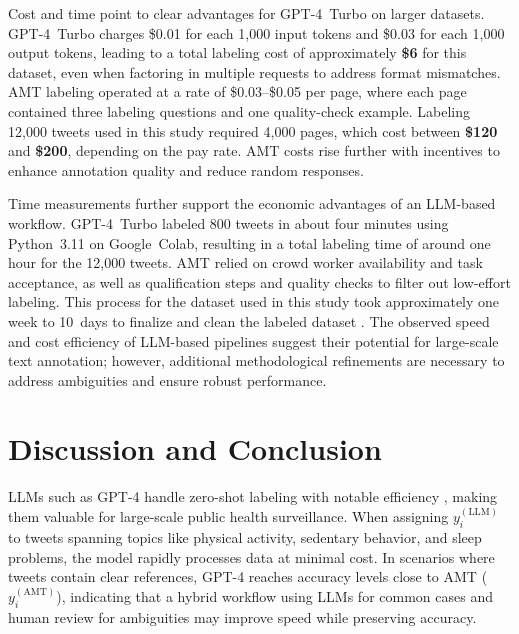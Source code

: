 \documentclass[letterpaper, 10 pt, conference]{ieeeconf} %
\begin{document}
Cost and time point to clear advantages for GPT-4~Turbo on larger datasets. GPT-4~Turbo charges \$0.01 for each 1,000 input tokens and \$0.03 for each 1,000 output tokens, leading to a total labeling cost of approximately \textbf{\$6} for this dataset, even when factoring in multiple requests to address format mismatches. AMT labeling operated at a rate of \$0.03–\$0.05 per page, where each page contained three labeling questions and one quality-check example.  Labeling 12,000 tweets used in this study required 4,000 pages, which cost between \textbf{\$120} and \textbf{\$200}, depending on the pay rate. AMT costs rise further with incentives to enhance annotation quality and reduce random responses.

Time measurements further support the economic advantages of an LLM-based workflow. GPT-4~Turbo labeled 800 tweets in about four minutes using Python~3.11 on Google~Colab, resulting in a total labeling time of around one hour for the 12,000 tweets. AMT relied on crowd worker availability and task acceptance, as well as qualification steps and quality checks to filter out low-effort labeling. This process for the dataset used in this study took approximately one week to 10~days to finalize and clean the labeled dataset \cite{shakeri2022physical, shakeri2022crowdsourcing}. The observed speed and cost efficiency of LLM-based pipelines suggest their potential for large-scale text annotation; however, additional methodological refinements are necessary to address ambiguities and ensure robust performance.


\vspace{-2mm}
\section{Discussion and Conclusion}

LLMs such as GPT-4 handle zero-shot labeling with notable efficiency \cite{brown2020language,radford2019language}, making them valuable for large-scale public health surveillance. When assigning \(y_i^{(\mathrm{LLM})}\) to tweets spanning topics like physical activity, sedentary behavior, and sleep problems, the model rapidly processes data at minimal cost. In scenarios where tweets contain clear references, GPT-4 reaches accuracy levels close to AMT (\(y_i^{(\mathrm{AMT})}\)), indicating that a hybrid workflow using LLMs for common cases and human review for ambiguities may improve speed while preserving accuracy. 
\end{document}
